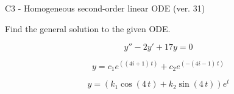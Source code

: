 \begin{exercise}
  \begin{exerciseTitle}C3 - Homogeneous second-order linear ODE (ver. 31)\end{exerciseTitle}
  \begin{exerciseStatement}
    
Find the general solution to the given ODE.

    
\[y''-2y'+17y = 0\]

  \end{exerciseStatement}
  \begin{exerciseAnswer}
    
\[y= c_{1} e^{\left(\left(4 i + 1\right) \, t\right)} + c_{2} e^{\left(-\left(4 i - 1\right) \, t\right)}\]

    
\[y= {\left(k_{1} \cos\left(4 \, t\right) + k_{2} \sin\left(4 \, t\right)\right)} e^{t}\]

  \end{exerciseAnswer}
\end{exercise}